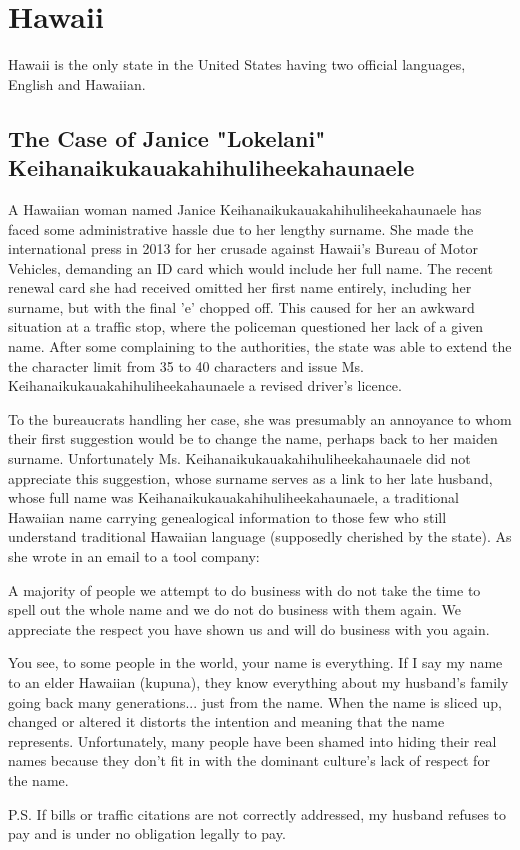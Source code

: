 \section{Hawaii}

Hawaii is the only state in the United States having two official languages, English and Hawaiian.

\subsection{The Case of Janice "Lokelani" Keihanaikukauakahihuliheekahaunaele}

A Hawaiian woman named Janice Keihanaikukauakahihuliheekahaunaele has faced some
administrative hassle due to her lengthy surname. She made the international
press in 2013 for her crusade against Hawaii's Bureau of Motor Vehicles,
demanding an ID card which would include her full name. The recent renewal card
she had received omitted her first name entirely, including her surname, but
with the final 'e' chopped off. This caused for her an awkward situation at a
traffic stop, where the policeman questioned her lack of a given name. After
some complaining to the authorities, the state was able to extend the the
character limit from 35 to 40 characters and issue Ms.
Keihanaikukauakahihuliheekahaunaele a revised driver's licence.

To the bureaucrats handling her case, she was presumably an annoyance to whom
their first suggestion would be to change the name, perhaps back to her maiden
surname. Unfortunately Ms. Keihanaikukauakahihuliheekahaunaele did not
appreciate this suggestion, whose surname serves as a link to her late husband,
whose full name was Keihanaikukauakahihuliheekahaunaele, a traditional Hawaiian
name carrying genealogical information to those few who still understand
traditional Hawaiian language (supposedly cherished by the state). As she wrote
in an email to a tool company:

\begin{aquote}{\parencite{lee-valley}}
A majority of people we attempt to do business with do not take the time to
	spell out the whole name and we do not do business with them again. We
	appreciate the respect you have shown us and will do business with you again.

You see, to some people in the world, your name is everything. If I say my name
	to an elder Hawaiian (kupuna), they know everything about my husband's family
	going back many generations... just from the name. When the name is sliced up,
	changed or altered it distorts the intention and meaning that the name
	represents. Unfortunately, many people have been shamed into hiding their real
	names because they don't fit in with the dominant culture's lack of respect
	for the name.

P.S. If bills or traffic citations are not correctly addressed, my husband
	refuses to pay and is under no obligation legally to pay.
\end{aquote}

